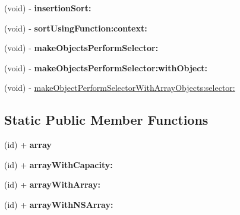 \begin{DoxyCompactItemize}
\item 
\hypertarget{interface_c_c_array_abb5b238dc39497d5585ecf39bee1b5de}{(void) -\/ {\bfseries insertion\-Sort\-:}}\label{interface_c_c_array_abb5b238dc39497d5585ecf39bee1b5de}

\item 
\hypertarget{interface_c_c_array_a730e39ec33282f1ba4e6cb9775e95a19}{(void) -\/ {\bfseries sort\-Using\-Function\-:context\-:}}\label{interface_c_c_array_a730e39ec33282f1ba4e6cb9775e95a19}

\item 
\hypertarget{interface_c_c_array_af0770ec1b5b1fcee0c6110a79619c61b}{(void) -\/ {\bfseries make\-Objects\-Perform\-Selector\-:}}\label{interface_c_c_array_af0770ec1b5b1fcee0c6110a79619c61b}

\item 
\hypertarget{interface_c_c_array_a80521d9e9e8542746aea5749416724d9}{(void) -\/ {\bfseries make\-Objects\-Perform\-Selector\-:with\-Object\-:}}\label{interface_c_c_array_a80521d9e9e8542746aea5749416724d9}

\item 
(void) -\/ \hyperlink{interface_c_c_array_a62fe0aecfe4e90d6f523cf892aedd867}{make\-Object\-Perform\-Selector\-With\-Array\-Objects\-:selector\-:}
\end{DoxyCompactItemize}
\subsection*{Static Public Member Functions}
\begin{DoxyCompactItemize}
\item 
\hypertarget{interface_c_c_array_adb9a21a6ad7ccadb0dfccebf55af3b49}{(id) + {\bfseries array}}\label{interface_c_c_array_adb9a21a6ad7ccadb0dfccebf55af3b49}

\item 
\hypertarget{interface_c_c_array_aad7075d0c7454da1db61e6cff05f8731}{(id) + {\bfseries array\-With\-Capacity\-:}}\label{interface_c_c_array_aad7075d0c7454da1db61e6cff05f8731}

\item 
\hypertarget{interface_c_c_array_a96875d9857776b088eb5f1445c942000}{(id) + {\bfseries array\-With\-Array\-:}}\label{interface_c_c_array_a96875d9857776b088eb5f1445c942000}

\item 
\hypertarget{interface_c_c_array_a76704f419abf246919d45c43ea059a43}{(id) + {\bfseries array\-With\-N\-S\-Array\-:}}\label{interface_c_c_array_a76704f419abf246919d45c43ea059a43}

\end{DoxyCompactItemize}
